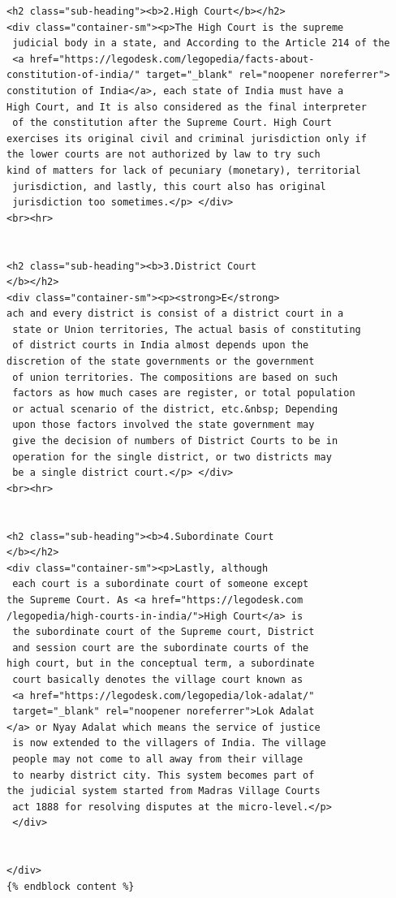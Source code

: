 \begin{verbatim}
<h2 class="sub-heading"><b>2.High Court</b></h2>
<div class="container-sm"><p>The High Court is the supreme
 judicial body in a state, and According to the Article 214 of the
 <a href="https://legodesk.com/legopedia/facts-about-
constitution-of-india/" target="_blank" rel="noopener noreferrer">
constitution of India</a>, each state of India must have a 
High Court, and It is also considered as the final interpreter
 of the constitution after the Supreme Court. High Court 
exercises its original civil and criminal jurisdiction only if 
the lower courts are not authorized by law to try such 
kind of matters for lack of pecuniary (monetary), territorial
 jurisdiction, and lastly, this court also has original
 jurisdiction too sometimes.</p> </div>
<br><hr>


<h2 class="sub-heading"><b>3.District Court
</b></h2>
<div class="container-sm"><p><strong>E</strong>
ach and every district is consist of a district court in a
 state or Union territories, The actual basis of constituting
 of district courts in India almost depends upon the 
discretion of the state governments or the government
 of union territories. The compositions are based on such
 factors as how much cases are register, or total population
 or actual scenario of the district, etc.&nbsp; Depending
 upon those factors involved the state government may
 give the decision of numbers of District Courts to be in
 operation for the single district, or two districts may
 be a single district court.</p> </div>
<br><hr>


<h2 class="sub-heading"><b>4.Subordinate Court
</b></h2>
<div class="container-sm"><p>Lastly, although
 each court is a subordinate court of someone except 
the Supreme Court. As <a href="https://legodesk.com
/legopedia/high-courts-in-india/">High Court</a> is
 the subordinate court of the Supreme court, District
 and session court are the subordinate courts of the 
high court, but in the conceptual term, a subordinate
 court basically denotes the village court known as
 <a href="https://legodesk.com/legopedia/lok-adalat/"
 target="_blank" rel="noopener noreferrer">Lok Adalat
</a> or Nyay Adalat which means the service of justice
 is now extended to the villagers of India. The village
 people may not come to all away from their village
 to nearby district city. This system becomes part of 
the judicial system started from Madras Village Courts
 act 1888 for resolving disputes at the micro-level.</p>
 </div>


</div>
{% endblock content %}
\end{verbatim}
